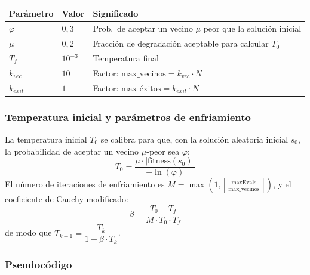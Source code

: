 \documentclass[12pt,a4paper]{article}
\begin{document}
\begin{center}
\begin{tabular}{lll}
\toprule
\textbf{Parámetro} & \textbf{Valor} & \textbf{Significado} \\
\midrule
$\varphi$ & $0{,}3$ & Prob.\ de aceptar un vecino $\mu$ peor que la solución inicial \\
$\mu$     & $0{,}2$ & Fracción de degradación aceptable para calcular $T_0$ \\
$T_f$     & $10^{-3}$ & Temperatura final \\
$k_{vec}$ & $10$ & Factor: $\text{max\_vecinos} = k_{vec} \cdot N$ \\
$k_{exit}$& $1$ & Factor: $\text{max\_éxitos} = k_{exit} \cdot N$ \\
\bottomrule
\end{tabular}
\end{center}

\subsubsection*{Temperatura inicial y parámetros de enfriamiento}

La temperatura inicial $T_0$ se calibra para que, con la solución aleatoria inicial $s_0$,
la probabilidad de aceptar un vecino $\mu$-peor sea $\varphi$:
\[
  T_0 = \frac{\mu \cdot |\text{fitness}(s_0)|}{-\ln(\varphi)}
\]
El número de iteraciones de enfriamiento es $M = \max\!\left(1,\left\lfloor \frac{\text{maxEvals}}{\text{max\_vecinos}} \right\rfloor\right)$,
y el coeficiente de Cauchy modificado:
\[
  \beta = \frac{T_0 - T_f}{M \cdot T_0 \cdot T_f}
\]
de modo que $T_{k+1} = \dfrac{T_k}{1 + \beta \cdot T_k}$.

\subsubsection*{Pseudocódigo}
\end{document}
